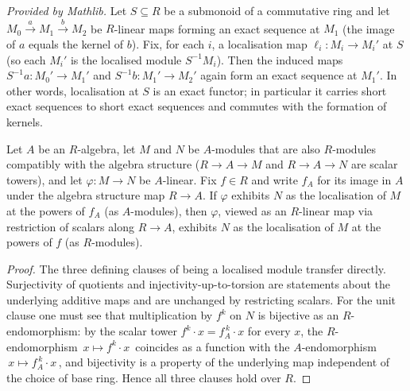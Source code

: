 \begin{lemma}
  \label{lem:localized_module_map_exact_mathlib}
  \mathlibok
  \textit{Provided by Mathlib.}
  Let \(S \subseteq R\) be a submonoid of a commutative ring and let
  \(M_0 \xrightarrow{\,a\,} M_1 \xrightarrow{\,b\,} M_2\) be \(R\)-linear maps forming an exact
  sequence at \(M_1\) (the image of \(a\) equals the kernel of \(b\)). Fix, for each \(i\), a
  localisation map \(\ell_i : M_i \to M_i'\) at \(S\) (so each \(M_i'\) is the localised module
  \(S^{-1} M_i\)). Then the induced maps \(S^{-1} a : M_0' \to M_1'\) and
  \(S^{-1} b : M_1' \to M_2'\) again form an exact sequence at \(M_1'\). In other words,
  localisation at \(S\) is an exact functor; in particular it carries short exact sequences to short
  exact sequences and commutes
  with the formation of kernels.
\end{lemma}

\begin{lemma}\leanok
  \label{lem:isLocalizedModule_powers_restrictScalars_of_algebraMap}
  Let \(A\) be an \(R\)-algebra, let \(M\) and \(N\) be \(A\)-modules that are also \(R\)-modules
  compatibly with the algebra structure (\(R \to A \to M\) and \(R \to A \to N\) are scalar towers),
  and let \(\varphi : M \to N\) be \(A\)-linear. Fix \(f \in R\) and write \(f_A\) for its image in
  \(A\) under the algebra structure map \(R \to A\). If \(\varphi\) exhibits \(N\) as the localisation of
  \(M\) at the powers of \(f_A\) (as \(A\)-modules), then
  \(\varphi\), viewed as an \(R\)-linear map via restriction of scalars along \(R \to A\), exhibits
  \(N\) as the localisation of \(M\) at the powers of \(f\) (as \(R\)-modules).
\end{lemma}
\begin{proof}

\leanok
  The three defining clauses of being a localised module transfer directly.
  Surjectivity of quotients
  and injectivity-up-to-torsion are statements about the underlying additive maps and are unchanged by
  restricting scalars. For the unit clause one must see that multiplication by \(f^k\) on \(N\) is
  bijective as an \(R\)-endomorphism: by the scalar tower \(f^k \cdot x = f_A^{\,k} \cdot x\) for every
  \(x\), the \(R\)-endomorphism \(\,x \mapsto f^k \cdot x\,\) coincides as a function with the
  \(A\)-endomorphism \(\,x \mapsto f_A^{\,k} \cdot x\,\), and bijectivity is a property of the
  underlying map independent of the choice of base ring. Hence all three clauses hold over \(R\).
\end{proof}

